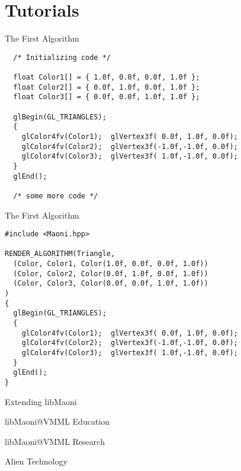 \documentclass[paper=screen,orient=landscape,style=aggie]{powerdot}
\begin{document}
\section{Tutorials}

\begin{slide}[method=file]{The First Algorithm}
\begin{lstlisting}
  /* Initializing code */

  float Color1[] = { 1.0f, 0.0f, 0.0f, 1.0f };
  float Color2[] = { 0.0f, 1.0f, 0.0f, 1.0f };
  float Color3[] = { 0.0f, 0.0f, 1.0f, 1.0f };

  glBegin(GL_TRIANGLES);
  {
    glColor4fv(Color1);  glVertex3f( 0.0f, 1.0f, 0.0f);
    glColor4fv(Color2);  glVertex3f(-1.0f,-1.0f, 0.0f);
    glColor4fv(Color3);  glVertex3f( 1.0f,-1.0f, 0.0f);
  }
  glEnd();

  /* some more code */
\end{lstlisting}
\end{slide}

\begin{slide}[method=file]{The First Algorithm}
\begin{lstlisting}
#include <Maoni.hpp>

RENDER_ALGORITHM(Triangle,
  (Color, Color1, Color(1.0f, 0.0f, 0.0f, 1.0f))
  (Color, Color2, Color(0.0f, 1.0f, 0.0f, 1.0f))
  (Color, Color3, Color(0.0f, 0.0f, 1.0f, 1.0f))
)
{
  glBegin(GL_TRIANGLES);
  {
    glColor4fv(Color1);  glVertex3f( 0.0f, 1.0f, 0.0f);
    glColor4fv(Color2);  glVertex3f(-1.0f,-1.0f, 0.0f);
    glColor4fv(Color3);  glVertex3f( 1.0f,-1.0f, 0.0f);
  }
  glEnd();
}
\end{lstlisting}
\end{slide}

\begin{slide}{Extending libMaoni}
\end{slide}

\begin{slide}{libMaoni@VMML Education}
\end{slide}

\begin{slide}{libMaoni@VMML Research}
\end{slide}

\begin{slide}{Alien Technology}
\end{slide}
\end{document}
